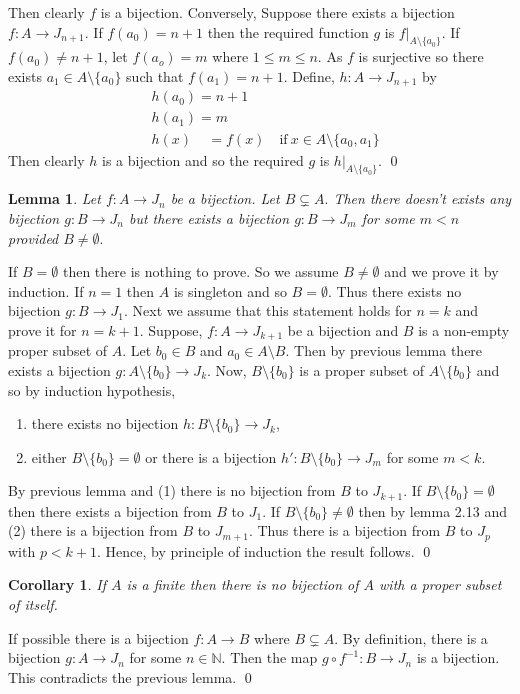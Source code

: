 \documentclass[11pt]{amsart}
\newtheorem{corollary}[theorem]{Corollary}%
\newtheorem{lemma}[theorem]{Lemma}%
\newcommand{\NN}{\mathbb N}
\begin{document}
Then clearly $f$ is a bijection. Conversely, Suppose there exists a bijection $f:A\to J_{n+1}.$ If $f(a_0)=n+1$ then the required function $g$ is $f\bigg|_{A\setminus \{a_0\}}.$ If $f(a_0)\neq n+1$, let $f(a_o)=m$ where $1\leq m\leq n.$ As $f$ is surjective so there exists $a_1\in A\setminus \{a_0\}$ such that $f(a_1)=n+1.$ Define, $h:A\to J_{n+1}$ by \begin{align*}
&h(a_0)=n+1\\
&h(a_1)=m\\
&h(x)~~~~~=f(x)\quad\text{if}~x\in A\setminus \{a_0,a_1\}
\end{align*}
Then clearly $h$ is a bijection and so the required $g$ is $h\bigg|_{A\setminus \{a_0\}}.$ \qed
\begin{lemma}
Let $f:A\to J_n$ be a bijection. Let $B\subsetneq A.$ Then there doesn't exists any bijection $g:B\to J_n$ but there exists a bijection $g:B\to J_m$ for some $m<n$ provided $B\neq \emptyset.$
\end{lemma}
\proof If $B=\emptyset$ then there is nothing to prove. So we assume $B\neq \emptyset$ and we prove it by induction. If $n=1$ then $A$ is singleton and so $B=\emptyset.$ Thus there exists no bijection $g:B\to J_1.$ Next we assume that this statement holds for $n=k$ and prove it for $n=k+1.$ Suppose, $f:A\to J_{k+1}$ be a bijection and $B$ is a non-empty proper subset of $A$. Let $b_0\in B$ and $a_0\in A\setminus B.$ Then by previous lemma there exists a bijection $g:A\setminus \{b_0\}\to J_k.$ Now, $B\setminus \{b_0\}$ is a proper subset of $A\setminus \{b_0\}$ and so by induction hypothesis, \begin{enumerate}
\item there exists no bijection $h:B\setminus \{b_0\}\to J_k$,
\item either $B\setminus \{b_0\}=\emptyset$ or there is a bijection $h':B\setminus \{b_0\}\to J_m$ for some $m<k.$
\end{enumerate}
By previous lemma and (1) there is no bijection from $B$ to $J_{k+1}.$ If $B\setminus \{b_0\}=\emptyset$ then there exists a bijection from $B$ to $J_1.$ If $B\setminus \{b_0\}\neq \emptyset$ then by lemma 2.13 and (2) there is a bijection from $B$ to $J_{m+1}.$ Thus there is a bijection from $B$ to $J_p$ with $p<k+1.$ Hence, by principle of induction the result follows. \qed
\begin{corollary}
If $A$ is a finite then there is no bijection of $A$ with a proper subset of itself.
\end{corollary}
\proof If possible there is a bijection $f:A\to B$ where $B\subsetneq A.$ By definition, there is a bijection $g:A\to J_n$ for some $n\in {\NN}.$ Then the map $g\circ f^{-1}:B\to J_n$ is a bijection. This contradicts the previous lemma. \qed
\end{document}
